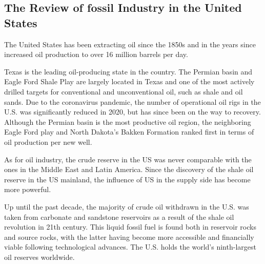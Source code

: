 \documentclass[
	a4paper, %
	12pt,%
]{CSSullivanBusinessReport}
\begin{document}
\begin{fullwidth}
\subsection{The Review of fossil Industry in the United States} 
The United States has been extracting oil since the 1850s and in the years since increased oil production to over 16 million barrels per day.
\par
Texas is the leading oil-producing state in the country. The Permian basin and Eagle Ford Shale Play are largely located in Texas and one of the most actively drilled targets for conventional and unconventional oil, such as shale and oil sands. Due to the coronavirus pandemic, the number of operational oil rigs in the U.S. was significantly reduced in 2020, but has since been on the way to recovery. Although the Permian basin is the most productive oil region, the neighboring Eagle Ford play and North Dakota’s Bakken Formation ranked first in terms of oil production per new well. \par
As for oil industry, the crude reserve in the US was never comparable with the ones in the Middle East and Latin America. Since the discovery of the shale oil reserve in the US mainland, the influence of US in the supply side has become more powerful. \par
Up until the past decade, the majority of crude oil withdrawn in the U.S. was taken from carbonate and sandstone reservoirs as a result of the shale oil revolution in 21th century. This liquid fossil fuel is found both in reservoir rocks and source rocks, with the latter having become more accessible and financially viable following technological advances. The U.S. holds the world’s ninth-largest oil reserves worldwide.


\end{fullwidth}
\end{document}
